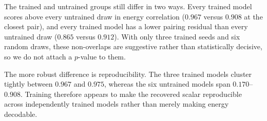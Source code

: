 The trained and untrained groups still differ in two ways. Every trained model scores above every
untrained draw in energy correlation ($0.967$ versus $0.908$ at the closest pair), and every trained
model has a lower pairing residual than every untrained draw ($0.865$ versus $0.912$). With only
three trained seeds and six random draws, these non-overlaps are suggestive rather than
statistically decisive, so we do not attach a $p$-value to them.

The more robust difference is reproducibility. The three trained models cluster tightly between
$0.967$ and $0.975$, whereas the six untrained models span $0.170$--$0.908$. Training therefore
appears to make the recovered scalar reproducible across independently trained models rather than
merely making energy decodable.
